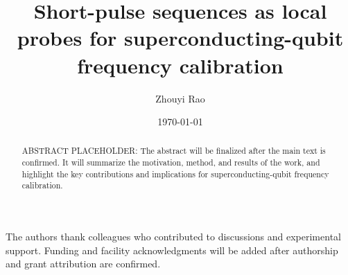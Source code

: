 \documentclass[aps,pra,reprint,superscriptaddress,floatfix]{revtex4-2}
\begin{document}
\title{Short-pulse sequences as local probes for superconducting-qubit frequency calibration}

\author{Zhouyi Rao}

\date{\today}

\begin{abstract}
    \centering
    ABSTRACT PLACEHOLDER: The abstract will be finalized after the main text is confirmed.  It will summarize the motivation, method, and results of the work, and highlight the key contributions and implications for superconducting-qubit frequency calibration.
\end{abstract}

\maketitle








\begin{acknowledgments}
The authors thank colleagues who contributed to discussions and experimental
support.  Funding and facility acknowledgments will be added after authorship
and grant attribution are confirmed.
\end{acknowledgments}

\appendix



\end{document}
